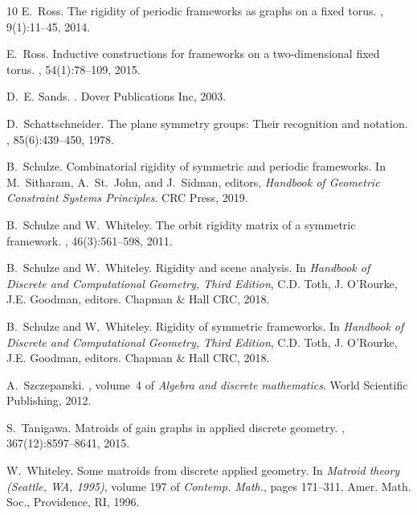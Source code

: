 \documentclass[reqno,a4paper,10pt]{article}
\theoremstyle{definition}
\theoremstyle{remark}
\numberwithin{equation}{section}
\numberwithin{figure}{section}
\numberwithin{table}{section}
\begin{document}
\begin{thebibliography}{10}
E.~Ross.
\newblock The rigidity of periodic frameworks as graphs on a fixed torus.
, 9(1):11--45, 2014.

E.~Ross.
\newblock Inductive constructions for frameworks on a two-dimensional fixed torus.
, 54(1):78--109, 2015.

D.~E. Sands.
.
\newblock Dover Publications Inc, 2003.

D.~Schattschneider.
\newblock The plane symmetry groups: Their recognition and notation.
, 85(6):439--450, 1978.

B.~Schulze.
\newblock Combinatorial rigidity of symmetric and periodic frameworks.
\newblock In M.~Sitharam, A.~St.~John, and J.~Sidman, editors, {\em {H}andbook of {G}eometric {C}onstraint {S}ystems {P}rinciples}. CRC Press, 2019.

B.~Schulze and W.~Whiteley.
\newblock The orbit rigidity matrix of a symmetric framework.
, 46(3):561--598, 2011.

B.~Schulze and W.~Whiteley.
\newblock Rigidity and scene analysis.
\newblock In {\em Handbook of Discrete and Computational Geometry, Third Edition}, C.D. Toth, J. O'Rourke, J.E. Goodman, editors. Chapman $\&$ Hall CRC, 2018.

B.~Schulze and W.~Whiteley.
\newblock Rigidity of symmetric frameworks.
\newblock In {\em Handbook of Discrete and Computational Geometry, Third Edition}, C.D. Toth, J. O'Rourke, J.E. Goodman, editors. Chapman $\&$ Hall CRC, 2018.

A.~Szczepanski.
, volume~4 of {\em Algebra and discrete mathematics}.
\newblock World Scientific Publishing, 2012.

S.~Tanigawa.
\newblock Matroids of gain graphs in applied discrete geometry.
, 367(12):8597--8641, 2015.

W.~Whiteley.
\newblock Some matroids from discrete applied geometry.
\newblock In {\em Matroid theory ({S}eattle, {WA}, 1995)}, volume 197 of {\em Contemp. Math.}, pages 171--311. Amer. Math. Soc., Providence, RI, 1996.

\end{thebibliography}
\end{document}
